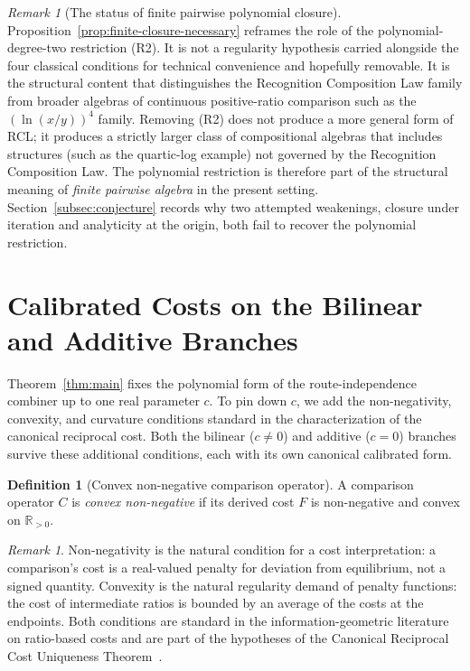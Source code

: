 \documentclass[11pt,a4paper]{article}
\theoremstyle{definition}
\newtheorem{definition}[theorem]{Definition}
\theoremstyle{remark}
\newtheorem{remark}[theorem]{Remark}
\begin{document}
\begin{remark}[The status of finite pairwise polynomial closure]
\label{rem:r2-status-update}
Proposition~\ref{prop:finite-closure-necessary} reframes the role of
the polynomial-degree-two restriction (R2). It is not a regularity
hypothesis carried alongside the four classical conditions for technical
convenience and hopefully removable. It is the structural content that
distinguishes the Recognition Composition Law family from broader
algebras of continuous positive-ratio comparison such as the
$(\ln(x/y))^4$ family. Removing (R2) does not produce a more general
form of RCL; it produces a strictly larger class of compositional
algebras that includes structures (such as the quartic-log example) not
governed by the Recognition Composition Law. The polynomial restriction
is therefore part of the structural meaning of \emph{finite pairwise
algebra} in the present setting. Section~\ref{subsec:conjecture} records
why two attempted weakenings, closure under iteration and analyticity at
the origin, both fail to recover the polynomial restriction.
\end{remark}

\section{Calibrated Costs on the Bilinear and Additive Branches}\label{sec:cost}

Theorem~\ref{thm:main} fixes the polynomial form of the route-independence
combiner up to one real parameter $c$. To pin down $c$, we add the
non-negativity, convexity, and curvature conditions standard in the
characterization of the canonical reciprocal cost. Both the bilinear
($c \neq 0$) and additive ($c = 0$) branches survive these additional
conditions, each with its own canonical calibrated form.

\begin{definition}[Convex non-negative comparison operator]
\label{def:convex-nonnegative}
A comparison operator $C$ is \emph{convex non-negative} if its derived cost
$F$ is non-negative and convex on $\mathbb{R}_{>0}$.
\end{definition}

\begin{remark}
Non-negativity is the natural condition for a cost interpretation: a
comparison's cost is a real-valued penalty for deviation from equilibrium,
not a signed quantity. Convexity is the natural regularity demand of
penalty functions: the cost of intermediate ratios is bounded by an average
of the costs at the endpoints. Both conditions are standard in the
information-geometric literature on ratio-based costs and are part of the
hypotheses of the Canonical Reciprocal Cost Uniqueness
Theorem~\cite{WashburnZlatanovic2026}.
\end{remark}
\end{document}
